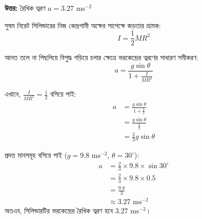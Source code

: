 \documentclass[12pt, a4paper]{article}
\begin{document}
\vspace{1em}
\begin{center}
\end{center}
\vspace{1em}

\begin{tcolorbox}[answerbox]
\textbf{\color{success} উত্তর:} রৈখিক ত্বরণ $a = 3.27\text{ ms}^{-2}$
\end{tcolorbox}
\vspace{1em}

\begin{tcolorbox}[solutionbox={সমাধান (Solution)}]
\noindent
সুষম নিরেট সিলিন্ডারের নিজ কেন্দ্রগামী অক্ষের সাপেক্ষে জড়তার ভ্রামক:
\[I = \frac{1}{2} M R^2\]

আনত তলে না পিছলিয়ে বিশুদ্ধ গড়িয়ে চলার ক্ষেত্রে ভরকেন্দ্রের ত্বরণের সাধারণ সমীকরণ:
\[a = \frac{g \sin\theta}{1 + \frac{I}{M R^2}}\]

এখানে, $\frac{I}{M R^2} = \frac{1}{2}$ বসিয়ে পাই:
\begin{align*}
    a &= \frac{g \sin\theta}{1 + \frac{1}{2}} \\
      &= \frac{g \sin\theta}{\frac{3}{2}} \\
      &= \frac{2}{3} g \sin\theta
\end{align*}

প্রদত্ত মানসমূহ বসিয়ে পাই ($g = 9.8\text{ ms}^{-2}$, $\theta = 30^\circ$):
\begin{align*}
    a &= \frac{2}{3} \times 9.8 \times \sin 30^\circ \\
      &= \frac{2}{3} \times 9.8 \times 0.5 \\
      &= \frac{9.8}{3} \\
      &\approx \mathbf{3.27}\text{ ms}^{-2}
\end{align*}
অতএব, সিলিন্ডারটির ভরকেন্দ্রের রৈখিক ত্বরণ হবে $3.27\text{ ms}^{-2}$।
\end{tcolorbox}
\end{document}
